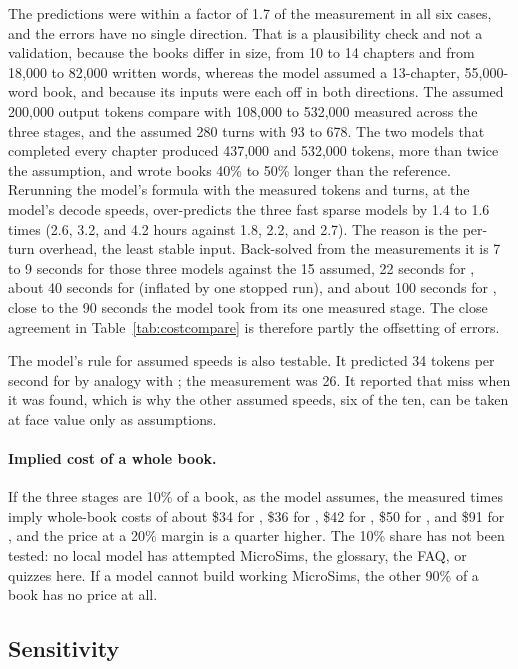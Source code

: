 The predictions were within a factor of 1.7 of the measurement in all six cases, and the errors have no single direction. That is a plausibility check and not a validation, because the books differ in size, from 10 to 14 chapters and from 18,000 to 82,000 written words, whereas the model assumed a 13-chapter, 55,000-word book, and because its inputs were each off in both directions. The assumed 200,000 output tokens compare with 108,000 to 532,000 measured across the three stages, and the assumed 280 turns with 93 to 678. The two models that completed every chapter produced 437,000 and 532,000 tokens, more than twice the assumption, and wrote books 40\% to 50\% longer than the reference. Rerunning the model's formula with the measured tokens and turns, at the model's decode speeds, over-predicts the three fast sparse models by 1.4 to 1.6 times (2.6, 3.2, and 4.2 hours against 1.8, 2.2, and 2.7). The reason is the per-turn overhead, the least stable input. Back-solved from the measurements it is 7 to 9 seconds for those three models against the 15 assumed, 22 seconds for \Gptoss, about 40 seconds for \Gthirtyone{} (inflated by one stopped run), and about 100 seconds for \Qeight, close to the 90 seconds the model took from its one measured stage. The close agreement in Table~\ref{tab:costcompare} is therefore partly the offsetting of errors.

The model's rule for assumed speeds is also testable. It predicted 34 tokens per second for \Qeight{} by analogy with \Gthirtyone; the measurement was 26. It reported that miss when it was found, which is why the other assumed speeds, six of the ten, can be taken at face value only as assumptions.

\paragraph{Implied cost of a whole book.}
If the three stages are 10\% of a book, as the model assumes, the measured times imply whole-book costs of about \$34 for \Gtwentysix, \$36 for \Gptoss, \$42 for \Qsix, \$50 for \Nemo, and \$91 for \Gthirtyone, and the price at a 20\% margin is a quarter higher. The 10\% share has not been tested: no local model has attempted MicroSims, the glossary, the FAQ, or quizzes here. If a model cannot build working MicroSims, the other 90\% of a book has no price at all.

\subsection{Sensitivity}

